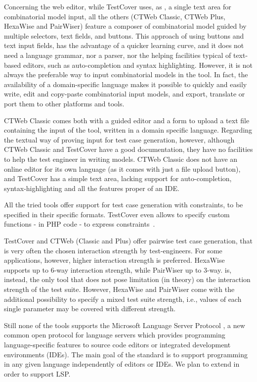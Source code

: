 \begin{tikzborder}{\cite{Gargantini16:validation}}
\begin{tikzborder}{\cite{gargantini_combinatorial_2017}}
\begin{tikzborder}{\cite{gargantini_combinatorial_2017}}
\begin{tikzborder}{\cite{garn2019}}
\begin{tikzborder}{\cite{arcaini2019achieving}}
\begin{tikzborder}{}
Concerning the web editor, while TestCover uses, as \ctwedge, a single text area for combinatorial model input,  all the others (CTWeb Classic, CTWeb Plus, HexaWise and PairWiser) feature a composer of combinatorial model guided by multiple selectors, text fields, and buttons. This approach of using buttons and text input fields, has the advantage of a quicker learning curve, and it does not need a language grammar, nor a parser, nor the helping facilities typical of text-based editors, such as auto-completion and syntax highlighting. However, it is not always the preferable way to input combinatorial models in the tool. In fact, the availability of a domain-specific language makes it possible to quickly and easily write, edit and copy-paste combinatorial input models, and export, translate or port them to other platforms and tools.


CTWeb Classic comes both with a guided editor and a form to upload a text file containing the input of the tool, written in a domain specific language. Regarding the textual way of proving input for test case generation, however, although CTWeb Classic and TestCover have a good documentation, they have no facilities to help the test engineer in writing models. CTWeb Classic does not have an online editor for its own language (as it comes with just a file upload button), and TestCover has a simple text area, lacking support for auto-completion, syntax-highlighting and all the features proper of an IDE.

All the tried tools offer support for test case generation with constraints, to be specified in their specific formats.  TestCover even allows to specify custom functions - in PHP code - to express constraints~\cite{sherwood2016embedded}.

TestCover and CTWeb (Classic and Plus) offer pairwise test case generation, that is very often the chosen interaction strength by test-engineers. For some applications, however, higher interaction strength is preferred. HexaWise supports up to 6-way interaction strength, while PairWiser up to 3-way. \ctwedge is, instead, the only tool that does not pose limitation (in theory) on the interaction strength of the test suite. However, HexaWise and PairWiser come with the additional possibility to specify a mixed test suite strength, i.e., values of each single parameter may be covered with different strength.

Still none of the tools supports the Microsoft Language Server Protocol \cite{lsp}, a new common open protocol for language servers which provides programming language-specific features to source code editors or integrated development environments (IDEs). The main goal of the standard is to support programming in any given language independently of editors or IDEs. We plan to extend \ctwedge in order to support LSP.
\end{tikzborder}


\end{tikzborder}
\end{tikzborder}
\end{tikzborder}
\end{tikzborder}
\end{tikzborder}
